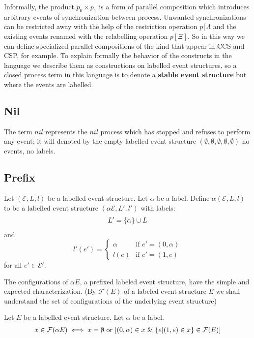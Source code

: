 \documentclass{article}
\begin{document}
Informally, the product $p_0 \times p_1$ is a form of parallel composition which introduces
arbitrary events of synchronization between process.
Unwanted synchronizations can be restricted away with the help of the restriction operation
$p\lceil \Lambda$ and the existing events renamed with the relabelling operation $p[\Xi]$.
So in this way we can define specialized parallel compositions of the kind that appear in
CCS and CSP, for example.
To explain formally the behavior of the constructs in the language we describe them as
constructions on labelled event structures, so a closed process term in this language is to
denote a \textbf{stable event structure} but where the events are labelled.

\subsection{Nil}
The term $nil$ represents the $nil$ process which has stopped and refuses to perform any event;
it will denoted by the empty labelled event structure $(\emptyset,\emptyset,\emptyset,\emptyset,\emptyset)$
no events, no labels.

\subsection{Prefix}

\begin{definition}
    Let $(\mathcal{E},L,l)$ be a labelled event structure.
    Let $\alpha$ be a label.
    Define $\alpha(\mathcal{E},L,l)$ to be a labelled event structure $(\alpha \mathcal{E},L',l')$
    with labels:
    \begin{align*}
        L' = \{\alpha\} \cup L
    \end{align*}
    and
    $$
        l'(e') = \begin{cases}
            \alpha & \text{if } e' = (0,\alpha) \\
            l(e)   & \text{if } e' = (1,e)
        \end{cases}
    $$
    for all $e' \in \mathcal{E'}$.
\end{definition}
The configurations of $\alpha E$, a prefixed labeled event structure,
have the simple and expected characterization.
(By $\mathcal{F}(E)$ of a labeled event structure $E$ we shall understand the set
of configurations of the underlying event structure)

\begin{proposition}

    Let $E$ be a labelled event structure. Let $\alpha$ be a label.
    \begin{align*}
        x \in \mathcal{F}(\alpha E) \iff x = \emptyset \text{ or }
        [(0,\alpha)\in x \ \& \  \{e | (1,e)\in x\} \in \mathcal{F}(E)]
    \end{align*}

\end{proposition}
\end{document}
